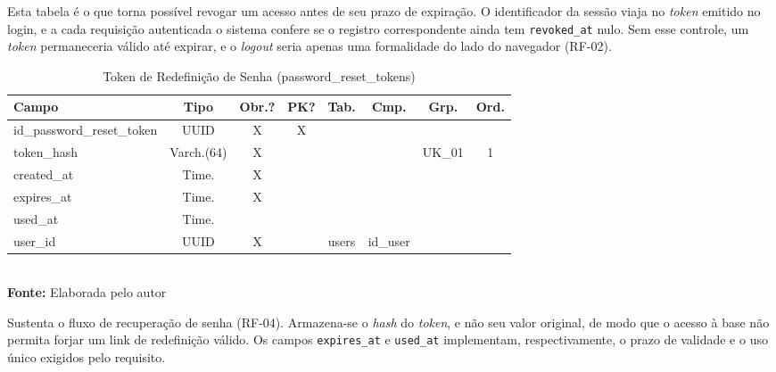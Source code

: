 Esta tabela é o que torna possível revogar um acesso antes de seu prazo de expiração. O identificador da sessão viaja no \textit{token} emitido no login, e a cada requisição autenticada o sistema confere se o registro correspondente ainda tem \texttt{revoked\_at} nulo. Sem esse controle, um \textit{token} permaneceria válido até expirar, e o \textit{logout} seria apenas uma formalidade do lado do navegador (RF-02).

\FloatBarrier
\begin{table}[!htbp]
\centering
\caption{Token de Redefinição de Senha (password\_reset\_tokens)}
\footnotesize
\begin{tabularx}{\textwidth}{ | X | c | c | c | c | c | c | c | }
    \hline
    \textbf{Campo} & \textbf{Tipo} & \textbf{Obr.?} & \textbf{PK?} & \textbf{Tab.} & \textbf{Cmp.} & \textbf{Grp.} & \textbf{Ord.}\\ \hline
    id\_password\_reset\_token & UUID & X & X &  &  &  &  \\ \hline
    token\_hash & Varch.(64) & X &  &  &  & UK\_01 & 1 \\ \hline
    created\_at & Time. & X &  &  &  &  &  \\ \hline
    expires\_at & Time. & X &  &  &  &  &  \\ \hline
    used\_at & Time. &  &  &  &  &  &  \\ \hline
    user\_id & UUID & X &  & users & id\_user &  &  \\ \hline
\end{tabularx}
\vspace{0.1cm} \\ \textbf{Fonte:} Elaborada pelo autor
\label{tab:tabelaPasswordResetTokenDetalhado}
\end{table}

Sustenta o fluxo de recuperação de senha (RF-04). Armazena-se o \textit{hash} do \textit{token}, e não seu valor original, de modo que o acesso à base não permita forjar um link de redefinição válido. Os campos \texttt{expires\_at} e \texttt{used\_at} implementam, respectivamente, o prazo de validade e o uso único exigidos pelo requisito.

